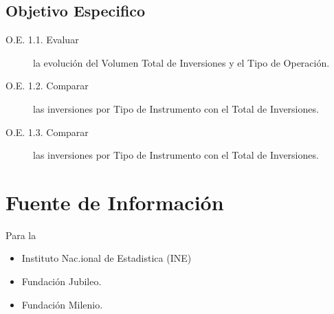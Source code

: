 \subsection{Objetivo Especifico}
\begin{description}
    \item[O.E. 1.1. Evaluar]  la evolución del Volumen Total de Inversiones y el Tipo de Operación.
    \item[O.E. 1.2. Comparar]  las inversiones por Tipo de Instrumento con el Total de Inversiones.
    \item[O.E. 1.3. Comparar]  las inversiones por Tipo de Instrumento con el Total de Inversiones.
\end{description}

\section{Fuente de Información }
Para la 
\begin{itemize}
  \item Instituto Nac.ional de Estadistica (INE)
  \item Fundación Jubileo.
\item Fundación Milenio.
\end{itemize}